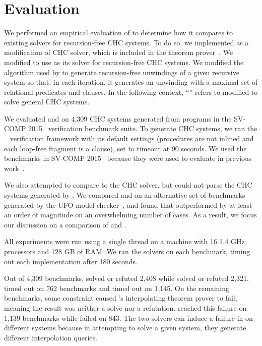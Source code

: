 \section{Evaluation}
\label{sec:evaluation}
We performed an empirical evaluation of \sys to determine how it
compares to existing solvers for recursion-free CHC systems.
%
To do so, we implemented \sys as a modification of \duality CHC
solver, which is included in the \zthree theorem prover~\cite{z3}.
%
We modified \duality to use \sys as its solver for recursion-free CHC
systems.
%
We modified the algorithm used by \duality to generate recursion-free
unwindings of a given recursive system so that, in each iteration, it
generates an unwinding with a maximal set of relational predicates and
clauses.
%
In the following context, ``\sys'' refers to \duality modified to
solve general CHC systems.

We evaluated \sys and \duality on 4,309 CHC systems generated from
programs in the SV-COMP 2015~\cite{svcomp15} verification benchmark
suite.
%
To generate CHC systems, we ran the \seahorn~\cite{gurfinkel15}
verification framework with its default settings (procedures are not
inlined and each loop-free fragment is a clause), set to timeout at 90
seconds.
%
We used the benchmarks in SV-COMP 2015~\cite{svcomp15} because they
were used to evaluate \duality in previous work~\cite{mcmillan14}.

We also attempted to compare \sys to the \eldarica CHC solver, but
\eldarica could not parse the CHC systems generated by \seahorn.
%
We compared \sys and \eldarica on an alternative set of benchmarks
generated by the UFO model checker~\cite{albarghouthi12c}, and found
that \sys outperformed \eldarica by at least an order of magnitude on
an overwhelming number of cases.
%
As a result, we focus our discussion on a comparison of \sys and
\duality.

All experiments were run using a single thread 
on a machine with 16 1.4 GHz processors and
128 GB of RAM.
%
We ran the solvers on each benchmark, timing out each implementation
after 180 seconds.

Out of 4,309 benchmarks, \sys solved or refuted 2,408 while \duality
solved or refuted 2,321. \sys timed out on 762 benchmarks and \duality
timed out on 1,145.
%
On the remaining benchmarks, some constraint caused \zthree's
interpolating theorem prover to fail, meaning the result was neither a
solve nor a refutation. \sys reached this failure on 1,139 benchmarks
while \duality failed on 843.
%
The two solvers can induce a failure in \zthree on different systems
because in attempting to solve a given system, they generate different
interpolation queries.


